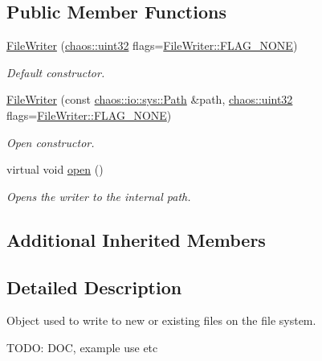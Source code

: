 \subsection*{Public Member Functions}
\begin{DoxyCompactItemize}
\item 
\hyperlink{classchaos_1_1io_1_1sys_1_1_file_writer_a84eee0f6699f145dd314201bbb60cab5}{File\-Writer} (\hyperlink{namespacechaos_a8641b3ae4551f0b35570d4f9f4ec22d9}{chaos\-::uint32} flags=\hyperlink{classchaos_1_1io_1_1sys_1_1_file_writer_aafcaef6dd3171373d8dfadadcc3c1b0bab1c0f867f11da4ed8678148548fa9458}{File\-Writer\-::\-F\-L\-A\-G\-\_\-\-N\-O\-N\-E})
\begin{DoxyCompactList}\small\item\em Default constructor. \end{DoxyCompactList}\item 
\hyperlink{classchaos_1_1io_1_1sys_1_1_file_writer_ade3f783fcaa44caf8ae1b3011e9847a1}{File\-Writer} (const \hyperlink{classchaos_1_1io_1_1sys_1_1_path}{chaos\-::io\-::sys\-::\-Path} \&path, \hyperlink{namespacechaos_a8641b3ae4551f0b35570d4f9f4ec22d9}{chaos\-::uint32} flags=\hyperlink{classchaos_1_1io_1_1sys_1_1_file_writer_aafcaef6dd3171373d8dfadadcc3c1b0bab1c0f867f11da4ed8678148548fa9458}{File\-Writer\-::\-F\-L\-A\-G\-\_\-\-N\-O\-N\-E})
\begin{DoxyCompactList}\small\item\em Open constructor. \end{DoxyCompactList}\item 
virtual void \hyperlink{classchaos_1_1io_1_1sys_1_1_file_writer_abddc915a52d4b589631d80bb24e013fe}{open} ()
\begin{DoxyCompactList}\small\item\em Opens the writer to the internal path. \end{DoxyCompactList}\end{DoxyCompactItemize}
\subsection*{Additional Inherited Members}


\subsection{Detailed Description}
Object used to write to new or existing files on the file system. 

T\-O\-D\-O\-: D\-O\-C, example use etc 

